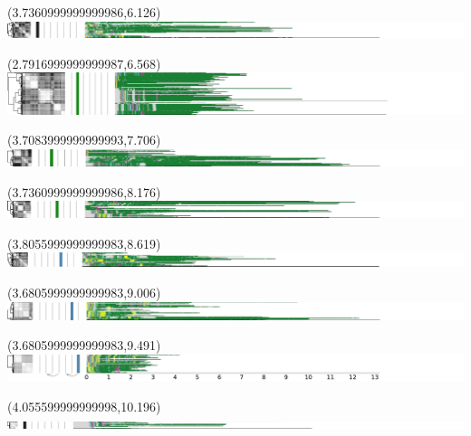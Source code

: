 \documentclass{article}
\begin{document}
\begin{textblock}{13}(3.7360999999999986,6.126)\includegraphics{latex/figures/haplotypes-constrained/6qtel_1-500K_1_12_12_rc-HG001.pdf}\end{textblock}
\begin{textblock}{13}(2.7916999999999987,6.568)\includegraphics{latex/figures/haplotypes-constrained/6qtel_1-500K_1_12_12_rc-HG002.pdf}\end{textblock}
\begin{textblock}{13}(3.7083999999999993,7.706)\includegraphics{latex/figures/haplotypes-constrained/6qtel_1-500K_1_12_12_rc-HG003.pdf}\end{textblock}
\begin{textblock}{13}(3.7360999999999986,8.176)\includegraphics{latex/figures/haplotypes-constrained/6qtel_1-500K_1_12_12_rc-HG004.pdf}\end{textblock}
\begin{textblock}{13}(3.8055999999999983,8.619)\includegraphics{latex/figures/haplotypes-constrained/6qtel_1-500K_1_12_12_rc-HG005.pdf}\end{textblock}
\begin{textblock}{13}(3.6805999999999983,9.006)\includegraphics{latex/figures/haplotypes-constrained/6qtel_1-500K_1_12_12_rc-HG006.pdf}\end{textblock}
\begin{textblock}{13}(3.6805999999999983,9.491)\includegraphics{latex/figures/haplotypes-constrained/6qtel_1-500K_1_12_12_rc-HG007.pdf}\end{textblock}
\begin{textblock}{13}(4.055599999999998,10.196)\includegraphics{latex/figures/haplotypes-constrained/chr7-HG001.pdf}\end{textblock}
\end{document}

